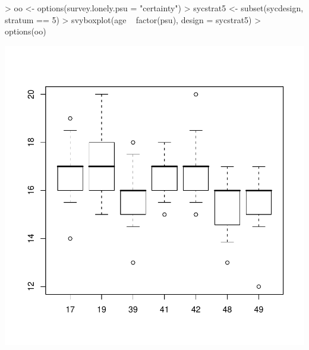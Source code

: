 \documentclass[article, 11pt, oneside]{memoir}
\begin{document}
     
\begin{Schunk}
\begin{Sinput}
> oo <- options(survey.lonely.psu = "certainty")
> sycstrat5 <- subset(sycdesign, stratum == 5)
> svyboxplot(age ~ factor(psu), design = sycstrat5)
> options(oo)
\end{Sinput}
\end{Schunk}
\includegraphics{SDA_using_survey-016}
\end{document}
